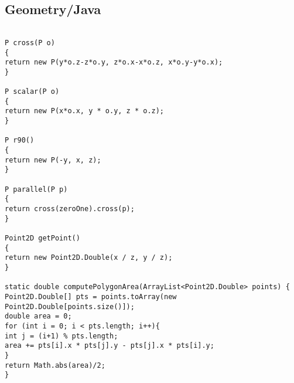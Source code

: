 \subsection{Geometry/Java}

\begin{lstlisting}

P cross(P o)
{
return new P(y*o.z-z*o.y, z*o.x-x*o.z, x*o.y-y*o.x);
}

P scalar(P o)
{
return new P(x*o.x, y * o.y, z * o.z);
}

P r90()
{
return new P(-y, x, z);
}

P parallel(P p)
{
return cross(zeroOne).cross(p);
}

Point2D getPoint()
{
return new Point2D.Double(x / z, y / z);
}

static double computePolygonArea(ArrayList<Point2D.Double> points) {
Point2D.Double[] pts = points.toArray(new Point2D.Double[points.size()]);
double area = 0;
for (int i = 0; i < pts.length; i++){
int j = (i+1) % pts.length;
area += pts[i].x * pts[j].y - pts[j].x * pts[i].y;
}
return Math.abs(area)/2;
}
\end{lstlisting}